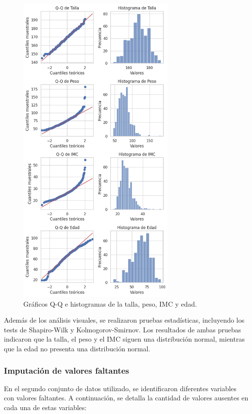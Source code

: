 \begin{figure}[h!]
	\centering
	\includegraphics[width=0.7\textwidth]{./Figures/qqplots2.png}
	\caption{Gráficos Q-Q e histogramas de la talla, peso, IMC y edad.}\label{fig:qqplots2}
\end{figure}

Además de los análisis visuales, se realizaron pruebas estadísticas, incluyendo los tests de Shapiro-Wilk 
y Kolmogorov-Smirnov. Los resultados de ambas pruebas indicaron que la talla, el peso y el IMC siguen una 
distribución normal, mientras que la edad no presenta una distribución normal.

\pagebreak 
\subsubsection{Imputación de valores faltantes}
En el segundo conjunto de datos utilizado, se identificaron diferentes variables con valores faltantes. 
A continuación, se detalla la cantidad de valores ausentes en cada una de estas variables:

